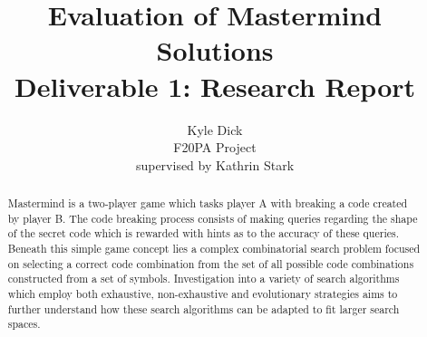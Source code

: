 \documentclass[11pt]{article}  %
\title{Evaluation of Mastermind Solutions\\
Deliverable 1: Research Report}
\author{Kyle Dick\\
F20PA Project\\
supervised by
Kathrin Stark}
\theoremstyle{definition}
\theoremstyle{remark}
\begin{document}
\maketitle

\newpage                     %
\begin{abstract}

Mastermind is a two-player game which tasks player A with breaking a code created by player B. The code breaking process consists of making queries regarding the shape of the secret code which is rewarded with hints as to the accuracy of these queries. Beneath this simple game concept lies a complex combinatorial search problem focused on selecting a correct code combination from the set of all possible code combinations constructed from a set of symbols. Investigation into a variety of search algorithms which employ both exhaustive, non-exhaustive and evolutionary strategies aims to further understand how these search algorithms can be adapted to fit larger search spaces.


\end{abstract}

\newpage                     %
\tableofcontents

\newpage                     %
\end{document}
